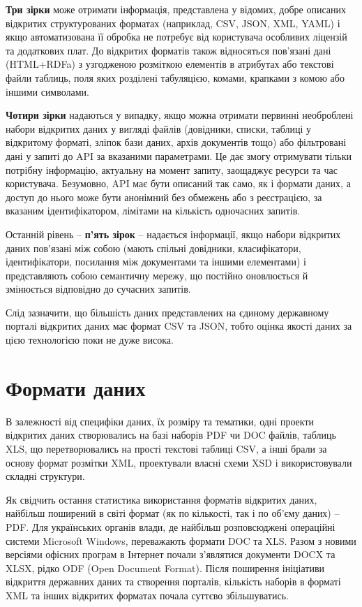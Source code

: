 \textbf{Три зірки} може отримати інформація, представлена у відомих, добре описаних відкритих структурованих форматах
(наприклад, CSV, JSON, XML, YAML) і якщо автоматизована її
обробка не потребує від користувача особливих ліцензій та додаткових плат. До відкритих
форматів також відносяться пов'язані дані (HTML+RDFa) з узгодженою розміткою елементів
в атрибутах або текстові файли таблиць, поля яких
розділені табуляцією, комами, крапками з комою або іншими символами.

\textbf{Чотири зірки} надаються у випадку, якщо можна отримати первинні необроблені набори
відкритих даних у вигляді файлів (довідники, списки, таблиці у відкритому форматі, зліпок
бази даних, архів документів тощо) або фільтровані дані у запиті до API за вказаними
параметрами. Це дає змогу отримувати тільки потрібну інформацію, актуальну на момент
запиту, заощаджує ресурси та час користувача. Безумовно, API має бути описаний так само,
як і формати даних, а доступ до нього може бути анонімний без обмежень або з реєстрацією,
за вказаним ідентифікатором, лімітами на кількість одночасних запитів.

Останній рівень – \textbf{п’ять зірок} – надається інформації, якщо набори відкритих даних
пов'язані між собою (мають спільні довідники, класифікатори, ідентифікатори, посилання
між документами та іншими елементами) і представляють собою семантичну мережу,
що постійно оновлюється й змінюється відповідно до сучасних запитів.

Слід зазначити, що більшість даних представлених на єдиному державному порталі відкритих даних
має формат CSV та JSON, тобто оцінка якості даних за цією технологією поки не дуже висока.

\section{Формати даних}

В залежності від специфіки даних, їх розміру та тематики,
одні проекти відкритих даних створювались на базі наборів PDF чи DOC файлів,
таблиць XLS, що перетворювались на прості текстові таблиці CSV, а інші брали за
основу формат розмітки XML, проектували власні схеми XSD і використовували складні
структури.

Як свідчить остання статистика використання форматів відкритих даних,
найбільш поширений в світі формат (як по кількості, так і по об'єму даних) – PDF.
Для українських органів влади, де найбільш розповсюджені операційні системи Microsoft Windows,
переважають формати DOC та XLS. Разом з новими версіями офісних програм в Інтернет почали
з’являтися документи DOCX та XLSX, рідко ODF (Open Document Format).
Після поширення ініціативи відкриття державних даних та
створення порталів, кількість наборів в форматі XML та інших відкритих форматах почала
суттєво збільшуватись.

